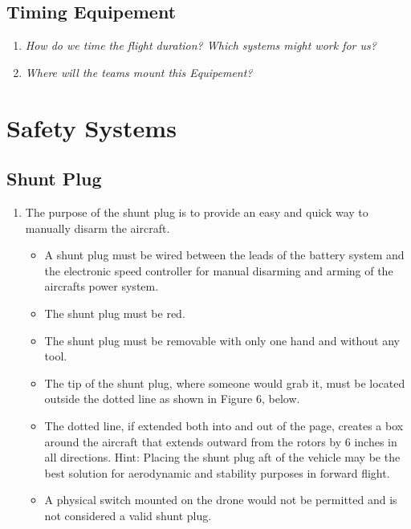 \documentclass{article}
\begin{document}
\subsection{Timing Equipement}
\begin{enumerate}
  \item \emph{How do we time the flight duration? Which systems might work for us?}
  \item \emph{Where will the teams mount this Equipement?}
\end{enumerate}

\section{Safety Systems}

\subsection{Shunt Plug}
\begin{enumerate}
  \item The purpose of the shunt plug is to provide an easy and quick way to manually disarm the
  aircraft.
  \begin{itemize}
    \item A shunt plug must be wired between the leads of the battery system and the electronic speed
    controller for manual disarming and arming of the aircrafts power system.
    \item The shunt plug must be red.
    \item The shunt plug must be removable with only one hand and without any tool.
    \item The tip of the shunt plug, where someone would grab it, must be located outside the dotted
    line as shown in Figure 6, below.
    \item The dotted line, if extended both into and out of the page, creates a box around the aircraft
    that extends outward from the rotors by 6 inches in all directions. Hint: Placing the shunt plug aft of the vehicle may be the best solution for aerodynamic and stability purposes in forward flight.
    \item A physical switch mounted on the drone would not be permitted and is not considered a valid shunt plug.
  \end{itemize}

\end{enumerate}
\end{document}
